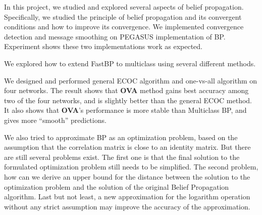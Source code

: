 In this project, we studied and explored several aspects of belief propagation. Specifically, we studied the principle of belief propagation and its convergent conditions and how to improve its convergence. We implemented convergence detection and message smoothing on PEGASUS implementation of BP. Experiment shows these two implementations work as expected.

We explored how to extend FastBP to multiclass using several different methods. 

We designed and performed general ECOC algorithm and one-vs-all algorithm on four networks. The result shows that \textbf{OVA} method gains best accuracy among two of the four networks, and is slightly better than the general ECOC method. It also shows that \textbf{OVA}’s performance is more stable than Multiclass BP, and gives more “smooth” predictions.

We also tried to approximate BP as an optimization problem, based on the assumption that the correlation matrix is close to an identity matrix. But there are still several problems exist. The first one is that the final solution to the formulated optimization problem still needs to be simplified. The second problem, how can we derive an upper bound for the distance between the solution to the optimization problem and the solution of the original Belief Propagation algorithm. Last but not least, a new approximation for the logarithm operation without any strict assumption may improve the accuracy of the approximation.